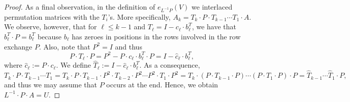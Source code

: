 \begin{proof}
    As a final observation, in the definition of $e_{L^{-1}P}(V)$ 
    we interlaced permutation matrices with the $T_i$'s. More specifically, 
    $A_k=T_k\cdot P\cdot T_{k-1}\cdots T_1\cdot A$. We observe, however, that for $\ell\leq k-1$ and
    $T_{\ell}=I-c_\ell\cdot b_\ell^T$, we have that  $b_\ell^T\cdot P=b_\ell^T$ because $b_\ell$ has zeroes in positions in the rows involved in the row exchange $P$. Also, note that  $P^2=I$ and thus 
    $$P\cdot T_\ell\cdot P=P^2-P\cdot c_\ell\cdot b_\ell^T\cdot P=I-\widehat{c}_\ell\cdot b_\ell^T,$$
where $\widehat{c}_\ell:=P\cdot c_\ell$. We define $\widehat{T}_\ell:=I-\widehat{c}_\ell\cdot b_\ell^T$.
    As a consequence,
    $$
    T_k\cdot P\cdot T_{k-1}\cdots T_1=T_k\cdot P\cdot T_{k-1}\cdot P^2\cdot T_{k-2}\cdot P^2\cdots P^2 \cdot T_1\cdot P^2=T_k\cdot (P\cdot T_{k-1}\cdot P)\cdots (P\cdot T_1\cdot P)\cdot P=\widehat{T}_{k-1}\cdots \widehat{T}_1\cdot P,
    $$
    and thus we may assume that $P$ occurs at the end. Hence, we obtain $L^{-1}\cdot P\cdot A=U$.
\end{proof}
